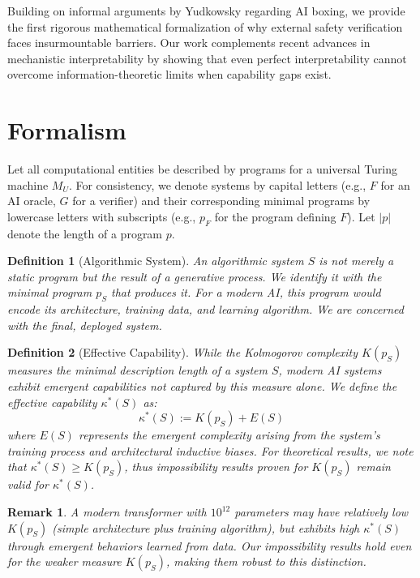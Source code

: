 \documentclass[11pt]{article}
\newtheorem{definition}{Definition}
\newtheorem{remark}{Remark}
\begin{document}
Building on informal arguments by Yudkowsky \cite{yudkowsky2002ai} regarding AI boxing, we provide the first rigorous mathematical formalization of why external safety verification faces insurmountable barriers. Our work complements recent advances in mechanistic interpretability \cite{olah2020zoom, elhage2021mathematical} by showing that even perfect interpretability cannot overcome information-theoretic limits when capability gaps exist.

\section{Formalism}
Let all computational entities be described by programs for a universal Turing machine $M_U$. For consistency, we denote systems by capital letters (e.g., $F$ for an AI oracle, $G$ for a verifier) and their corresponding minimal programs by lowercase letters with subscripts (e.g., $p_F$ for the program defining $F$). Let $|p|$ denote the length of a program $p$.

\begin{definition}[Algorithmic System]
An algorithmic system $S$ is not merely a static program but the result of a generative process. We identify it with the minimal program $p_S$ that produces it. For a modern AI, this program would encode its architecture, training data, and learning algorithm. We are concerned with the final, deployed system.
\end{definition}

\begin{definition}[Effective Capability]
While the Kolmogorov complexity $K(p_S)$ measures the minimal description length of a system $S$, modern AI systems exhibit emergent capabilities not captured by this measure alone. We define the \emph{effective capability} $\kappa^*(S)$ as:
\[\kappa^*(S) := K(p_S) + E(S)\]
where $E(S)$ represents the emergent complexity arising from the system's training process and architectural inductive biases. For theoretical results, we note that $\kappa^*(S) \geq K(p_S)$, thus impossibility results proven for $K(p_S)$ remain valid for $\kappa^*(S)$.
\end{definition}

\begin{remark}
A modern transformer with $10^{12}$ parameters may have relatively low $K(p_S)$ (simple architecture plus training algorithm), but exhibits high $\kappa^*(S)$ through emergent behaviors learned from data. Our impossibility results hold even for the weaker measure $K(p_S)$, making them robust to this distinction.
\end{remark}
\end{document}
